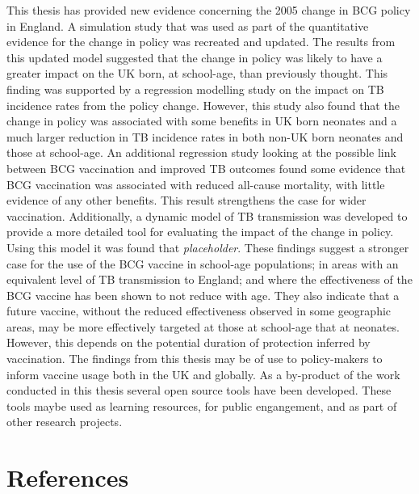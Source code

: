 \documentclass[11pt,twoside]{bristolthesis}
\begin{document}
  This thesis has provided new evidence concerning the 2005 change in BCG policy in England. A simulation study that was used as part of the quantitative evidence for the change in policy was recreated and updated. The results from this updated model suggested that the change in policy was likely to have a greater impact on the UK born, at school-age, than previously thought. This finding was supported by a regression modelling study on the impact on TB incidence rates from the policy change. However, this study also found that the change in policy was associated with some benefits in UK born neonates and a much larger reduction in TB incidence rates in both non-UK born neonates and those at school-age. An additional regression study looking at the possible link between BCG vaccination and improved TB outcomes found some evidence that BCG vaccination was associated with reduced all-cause mortality, with little evidence of any other benefits. This result strengthens the case for wider vaccination. Additionally, a dynamic model of TB transmission was developed to provide a more detailed tool for evaluating the impact of the change in policy. Using this model it was found that \emph{placeholder}. These findings suggest a stronger case for the use of the BCG vaccine in school-age populations; in areas with an equivalent level of TB transmission to England; and where the effectiveness of the BCG vaccine has been shown to not reduce with age. They also indicate that a future vaccine, without the reduced effectiveness observed in some geographic areas, may be more effectively targeted at those at school-age that at neonates. However, this depends on the potential duration of protection inferred by vaccination. The findings from this thesis may be of use to policy-makers to inform vaccine usage both in the UK and globally. As a by-product of the work conducted in this thesis several open source tools have been developed. These tools maybe used as learning resources, for public engangement, and as part of other research projects.
  
  \backmatter
  
  \hypertarget{references}{%
  \chapter{References}\label{references}}
  
  \noindent
  
  \setlength{\parindent}{-0.20in}
  \setlength{\leftskip}{0.20in}
  \setlength{\parskip}{8pt}
  
\end{document}

